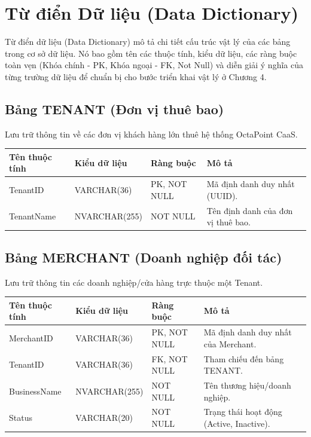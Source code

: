 \section{Từ điển Dữ liệu (Data Dictionary)}

Từ điển dữ liệu (Data Dictionary) mô tả chi tiết cấu trúc vật lý của các bảng trong cơ sở dữ liệu. Nó bao gồm tên các thuộc tính, kiểu dữ liệu, các ràng buộc toàn vẹn (Khóa chính - PK, Khóa ngoại - FK, Not Null) và diễn giải ý nghĩa của từng trường dữ liệu để chuẩn bị cho bước triển khai vật lý ở Chương 4.

\subsection{Bảng TENANT (Đơn vị thuê bao)}
Lưu trữ thông tin về các đơn vị khách hàng lớn thuê hệ thống OctaPoint CaaS.

\begin{table}[htbp]
    \centering
    \renewcommand{\arraystretch}{1.3}
    \begin{tabular}{|p{3cm}|p{3.2cm}|>{\raggedright\arraybackslash}p{3.2cm}|>{\raggedright\arraybackslash}p{4.8cm}|}
        \hline
        \textbf{Tên thuộc tính} & \textbf{Kiểu dữ liệu} & \textbf{Ràng buộc} & \textbf{Mô tả} \\ \hline
        TenantID & VARCHAR(36) & PK, NOT NULL & Mã định danh duy nhất (UUID). \\ \hline
        TenantName & NVARCHAR(255) & NOT NULL & Tên định danh của đơn vị thuê bao. \\ \hline
    \end{tabular}
\end{table}

\subsection{Bảng MERCHANT (Doanh nghiệp đối tác)}
Lưu trữ thông tin các doanh nghiệp/cửa hàng trực thuộc một Tenant.

\begin{table}[htbp]
    \centering
    \renewcommand{\arraystretch}{1.3}
    \begin{tabular}{|p{3cm}|p{3.2cm}|>{\raggedright\arraybackslash}p{3.2cm}|>{\raggedright\arraybackslash}p{4.8cm}|}
        \hline
        \textbf{Tên thuộc tính} & \textbf{Kiểu dữ liệu} & \textbf{Ràng buộc} & \textbf{Mô tả} \\ \hline
        MerchantID & VARCHAR(36) & PK, NOT NULL & Mã định danh duy nhất của Merchant. \\ \hline
        TenantID & VARCHAR(36) & FK, NOT NULL & Tham chiếu đến bảng TENANT. \\ \hline
        BusinessName & NVARCHAR(255) & NOT NULL & Tên thương hiệu/doanh nghiệp. \\ \hline
        Status & VARCHAR(20) & NOT NULL & Trạng thái hoạt động (Active, Inactive). \\ \hline
    \end{tabular}
\end{table}

